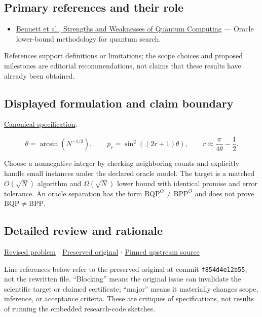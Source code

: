 \documentclass[
  11pt,
]{article}
\providecommand{\tightlist}{%
  \setlength{\itemsep}{0pt}\setlength{\parskip}{0pt}}
\begin{document}
\subsection{Primary references and their role}

\begin{itemize}
\tightlist
\item
  \href{https://arxiv.org/abs/quant-ph/9701001}{Bennett et al.,
  Strengths and Weaknesses of Quantum Computing} --- Oracle lower-bound
  methodology for quantum search.
\end{itemize}

References support definitions or limitations; the scope choices and
proposed milestones are editorial recommendations, not claims that these
results have already been obtained.

\subsection{Displayed formulation and claim boundary}

\href{https://github.com/rick-stevens-ai/Pure-Thought/blob/main/PRDs/25-Quantum-Algorithms-Complexity.md}{Canonical
specification}.

\[\theta=\arcsin(N^{-1/2}),\qquad
p_r=\sin^2((2r+1)\theta),\qquad
r\approx\frac{\pi}{4\theta}-\frac12.\]

Choose a nonnegative integer by checking neighboring counts and
explicitly handle small instances under the declared oracle model. The
target is a matched \(O(\sqrt N)\) algorithm and \(\Omega(\sqrt N)\)
lower bound with identical promise and error tolerance. An oracle
separation has the form \(\mathrm{BQP}^O\ne\mathrm{BPP}^O\) and does not
prove \(\mathrm{BQP}\ne\mathrm{BPP}\).

\subsection{Detailed review and rationale}

\href{https://github.com/rick-stevens-ai/Pure-Thought/blob/main/PRDs/25-Quantum-Algorithms-Complexity.md}{Revised
problem} \ensuremath{\cdot}
\href{https://github.com/rick-stevens-ai/Pure-Thought/blob/main/archive/original-PRDs/25-Quantum-Algorithms-Complexity.md}{Preserved
original} \ensuremath{\cdot}
\href{https://github.com/rick-stevens-ai/Pure-Thought/blob/f854d4e12b55c1f5b5c2a964b75f2d23496d981e/PRDs/25-Quantum-Algorithms-Complexity.md}{Pinned
upstream source}

Line references below refer to the preserved original at commit
\texttt{f854d4e12b55}, not the rewritten file. ``Blocking'' means the
original issue can invalidate the scientific target or claimed
certificate; ``major'' means it materially changes scope, inference, or
acceptance criteria. These are critiques of specifications, not results
of running the embedded research-code sketches.
\end{document}
